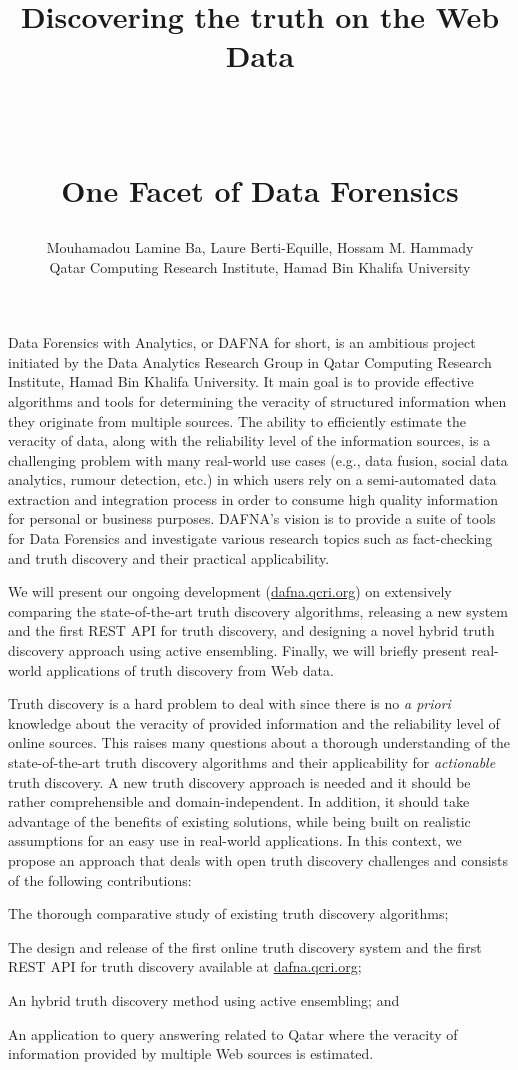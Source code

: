 \documentclass[paper=a4, fontsize=11pt]{scrartcl}	%
\title{ \vspace{-1in} 	\usefont{OT1}{bch}{b}{n}
		\huge \strut Discovering the truth on the Web Data\strut \\
		\Large \bfseries \strut One Facet of Data Forensics\strut
}
\author{ 									\usefont{OT1}{bch}{m}{n}
        Mouhamadou Lamine Ba, Laure Berti-Equille, Hossam M. Hammady\\		\usefont{OT1}{bch}{m}{n}
        Qatar Computing Research Institute, Hamad Bin Khalifa University\\	\usefont{OT1}{bch}{m}{n}
}
\date{}
\numberwithin{equation}{section}															%
\numberwithin{figure}{section}																%
\numberwithin{table}{section}																%
\begin{document}
\maketitle
 \vspace*{-1.4cm}
Data Forensics with Analytics, or DAFNA for short, is an ambitious project initiated by the Data Analytics Research Group in Qatar Computing Research
 Institute, Hamad Bin Khalifa University. It main goal is to provide effective algorithms and tools for determining the veracity of structured information when they originate from  multiple  sources. The ability to efficiently estimate the veracity of data, along with the reliability level of the information sources,
 is a challenging problem with many real-world use cases (e.g., data fusion, social data analytics, rumour detection, etc.) in which users rely on  a semi-automated data extraction  and integration process in order to consume high quality information for personal or business purposes. DAFNA's vision is to provide a suite of tools for Data Forensics and investigate various research topics such as fact-checking and truth discovery and their practical applicability.

We will present our ongoing development (\url{dafna.qcri.org}) on extensively comparing the state-of-the-art truth discovery algorithms, releasing a new system and 
the first REST API for truth discovery, and designing a novel hybrid truth discovery approach using active ensembling. Finally, we will briefly present real-world
applications of truth discovery from Web data.
 
Truth discovery is a hard problem to deal with since there is no {\it a priori} knowledge about the veracity of provided information and the reliability level of online sources.
This raises many questions about a thorough understanding of the state-of-the-art truth discovery algorithms and their applicability for {\it actionable} truth discovery.  A new 
truth discovery approach is needed and it should be rather comprehensible and domain-independent. In addition, it should take  advantage of the benefits of existing solutions, while 
being built on realistic assumptions for an easy use in real-world applications.  In this context, we propose an approach that deals with open truth discovery challenges and consists 
of the following contributions:
 \begin{inparaenum}[(i)]
  \item The thorough comparative study of existing truth discovery algorithms;  
 \item The design and release of the first online truth discovery system and the first REST API for truth discovery available at \url{dafna.qcri.org};
 \item An hybrid truth discovery method using active ensembling; and
 \item An application to query answering related to Qatar where the veracity of information provided by multiple  Web sources is estimated.
 \end{inparaenum}

  \footnotesize
 
 
 \nocite{7113396}
 \nocite{DBLP:journals/corr/WaguihB14}
 \nocite{laurebook}
\end{document}
